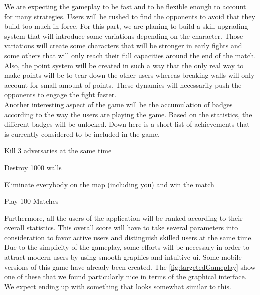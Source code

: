 We are expecting the gameplay to be fast and to be flexible enough to account for many strategies. Users will be rushed to find the opponents to avoid that they build too much in force. For this part, we are planing to build a skill upgrading system that will introduce some variations depending on the character. Those variations will create some characters that will be stronger in early fights and some others that will only reach their full capacities around the end of the match. Also, the point system will be created in such a way that the only real way to make points will be to tear down the other users whereas breaking walls will only account for small amount of points. These dynamics will necessarily push the opponents to engage the fight faster. \\

Another interesting aspect of the game will be the accumulation of badges according to the way the users are playing the game. Based on the statistics, the different badges will be unlocked. Down here is a short list of achievements that is currently considered to be included in the game.
\begin{multicols}{2}
  \begin{description}[style=nextline]
    \item [Collateral Dommage] Kill 3 adversaries at the same time
    \item [Excavator] Destroy 1000 walls
    \item [Kamikaze] Eliminate everybody on the map (including you) and win the match
    \item [Veteran] Play 100 Matches
  \end{description}
\end{multicols}
Furthermore, all the users of the application will be ranked according to their overall statistics. This overall score will have to take several parameters into consideration to favor active users and distinguish skilled users at the same time. \\

Due to the simplicity of the gameplay, some efforts will be necessary in order to attract modern users by using smooth graphics and intuitive \gls{ui}. Some mobile versions of this game have already been created. The \autoref{fig:targetedGameplay} show one of these that we found particularly nice in terms of the graphical interface. We expect ending up with something that looks somewhat similar to this.

